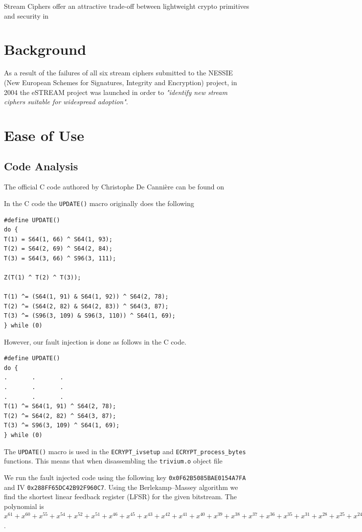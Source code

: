\documentclass[conference]{IEEEtran}
\newcommand{\code}[1]{\texttt{#1}}
\begin{document}
Stream Ciphers offer an attractive trade-off between lightweight crypto primitives and security in 

\section{Background}

As a result of the failures of all six stream ciphers submitted to the NESSIE (New European Schemes for Signatures, Integrity and Encryption) project, in 2004 the eSTREAM project was launched in order to \textit{"identify new stream ciphers suitable for widespread adoption"}\cite{call}.



\section{Ease of Use}

\subsection{Code Analysis}
The official C code authored by Christophe De Canni\`ere can be found on  

In the C code the \code{UPDATE()} macro originally does the following
\begin{lstlisting}[style=snippet]
#define UPDATE()
do { 
T(1) = S64(1, 66) ^ S64(1, 93);
T(2) = S64(2, 69) ^ S64(2, 84);
T(3) = S64(3, 66) ^ S96(3, 111);

Z(T(1) ^ T(2) ^ T(3));

T(1) ^= (S64(1, 91) & S64(1, 92)) ^ S64(2, 78); 
T(2) ^= (S64(2, 82) & S64(2, 83)) ^ S64(3, 87); 
T(3) ^= (S96(3, 109) & S96(3, 110)) ^ S64(1, 69); 
} while (0)
\end{lstlisting}
However, our fault injection is done as follows in the C code.
\begin{lstlisting}[style=snippet]
#define UPDATE()
do {
.       .       .
.       .       .
.       .       .
T(1) ^= S64(1, 91) ^ S64(2, 78); 
T(2) ^= S64(2, 82) ^ S64(3, 87); 
T(3) ^= S96(3, 109) ^ S64(1, 69); 
} while (0)
\end{lstlisting}

The \code{UPDATE()} macro is used in the \code{ECRYPT\_ivsetup} and \code{ECRYPT\_process\_bytes} functions. This means that when disassembling the \code{trivium.o} object file 

We run the fault injected code using the following key \code{0x0F62B5085BAE0154A7FA} and IV \code{0x288FF65DC42B92F960C7}. Using the Berlekamp–Massey algorithm \cite{massey} we find the shortest linear feedback register (LFSR) for the given bitstream. The polynomial is
$x^{61} + x^{60} + x^{55} + x^{54} + x^{52} + x^{51} + x^{46} + x^{45} + x^{43} + x^{42} + x^{41} + x^{40} + x^{39} + x^{38} + x^{37} + x^{36} + x^{35} + x^{31} + x^{28} + x^{25} + x^{24} + x^{23} + x^{20} + x^{19} + x^{18} + x^{11} + x^8 + x^7 + 1$.
\end{document}

